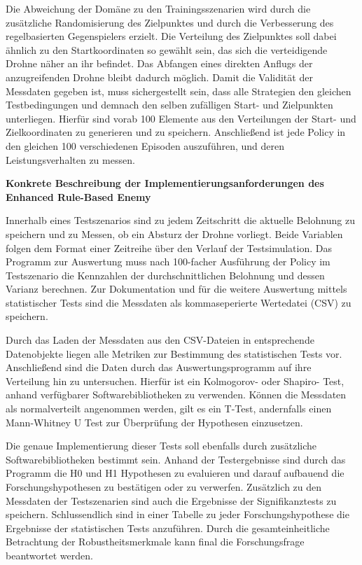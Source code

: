 Die Abweichung der Domäne zu den Trainingsszenarien wird durch die zusätzliche Randomisierung des Zielpunktes und durch die Verbesserung des regelbasierten Gegenspielers erzielt. 
Die Verteilung des Zielpunktes soll dabei ähnlich zu den Startkoordinaten so gewählt sein, das sich die verteidigende Drohne näher an ihr befindet.
Das Abfangen eines direkten Anflugs der anzugreifenden Drohne bleibt dadurch möglich.
Damit die Validität der Messdaten gegeben ist, muss sichergestellt sein, dass alle Strategien den gleichen Testbedingungen und demnach den selben zufälligen Start- und Zielpunkten unterliegen.
Hierfür sind vorab 100 Elemente aus den Verteilungen der Start- und Zielkoordinaten zu generieren und zu speichern.
Anschließend ist jede Policy in den gleichen 100 verschiedenen Episoden auszuführen, und deren Leistungsverhalten zu messen.

\textbf{Konkrete Beschreibung der Implementierungsanforderungen des Enhanced Rule-Based Enemy}

Innerhalb eines Testszenarios sind zu jedem Zeitschritt die aktuelle Belohnung zu speichern und zu Messen, ob ein Absturz der Drohne vorliegt.
Beide Variablen folgen dem Format einer Zeitreihe über den Verlauf der Testsimulation.
Das Programm zur Auswertung muss nach 100-facher Ausführung der Policy im Testszenario die Kennzahlen der durchschnittlichen Belohnung und dessen Varianz berechnen.
Zur Dokumentation und für die weitere Auswertung mittels statistischer Tests sind die Messdaten als kommaseperierte Wertedatei (CSV) zu speichern.

Durch das Laden der Messdaten aus den CSV-Dateien in entsprechende Datenobjekte liegen alle Metriken zur Bestimmung des statistischen Tests vor.
Anschließend sind die Daten durch das Auswertungsprogramm auf ihre Verteilung hin zu untersuchen.
Hierfür ist ein Kolmogorov- oder Shapiro- Test, anhand verfügbarer Softwarebibliotheken zu verwenden.
Können die Messdaten als normalverteilt angenommen werden, gilt es ein T-Test, andernfalls einen Mann-Whitney U Test zur Überprüfung der Hypothesen einzusetzen.

Die genaue Implementierung dieser Tests soll ebenfalls durch zusätzliche Softwarebibliotheken bestimmt sein.
Anhand der Testergebnisse sind durch das Programm die H0 und H1 Hypothesen zu evaluieren und darauf aufbauend die Forschungshypothesen zu bestätigen oder zu verwerfen.
Zusätzlich zu den Messdaten der Testszenarien sind auch die Ergebnisse der Signifikanztests zu speichern.
Schlussendlich sind in einer Tabelle zu jeder Forschungshypothese die Ergebnisse der statistischen Tests anzuführen.
Durch die gesamteinheitliche Betrachtung der Robustheitsmerkmale kann final die Forschungsfrage beantwortet werden.
